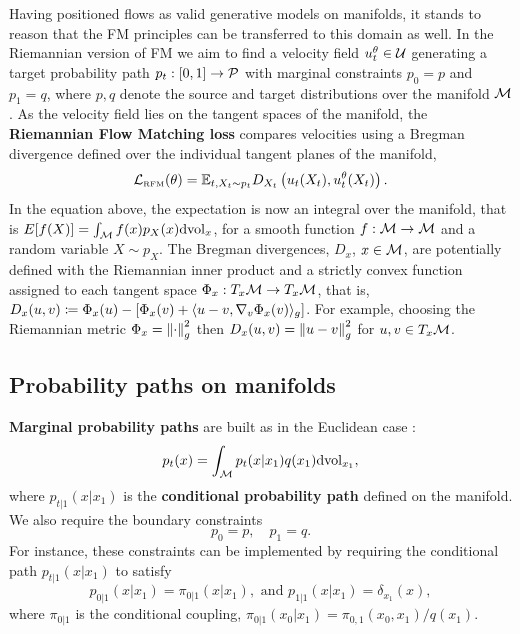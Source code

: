 \documentclass{fairmeta}
\newcommand{\highlight}[1]{{\color{metablue} \textbf{#1}}}
\renewcommand{\eqref}[1]{\labelcref{#1}}
\numberwithin{equation}{section}
\begin{document}
Having positioned flows as valid generative models on manifolds, it stands to reason that the FM principles can be transferred to this domain as well.
In the Riemannian version of FM we aim to find a velocity field $u_t^\theta\in{\mathcal{U}}$ generating a target probability path $p_t:[0,1]\rightarrow{\mathcal{P}}$ with marginal constraints $p_0=p$ and $p_1=q$, where $p,q$ denote the source and target distributions over the manifold ${\mathcal{M}}$.
As the velocity field lies on the tangent spaces of the manifold, the \highlight{Riemannian Flow Matching loss} compares velocities using a Bregman divergence defined over the individual tangent planes of the manifold, 
\begin{equation}\label{e:rfm_loss}
    \gL_{\RFM}(\theta) = \E_{t,X_t\sim p_t}D_{X_t}\parr{u_t(X_t),u_t^\theta(X_t)}. %
\end{equation}
In the equation above, the expectation is now an integral over the manifold, that is $E[f(X)]=\int_{\mathcal{M}} f(x)p_X(x)\mathrm{d} \mathrm{vol}_x$, for a smooth function $f:{\mathcal{M}}\rightarrow{\mathcal{M}}$ and a random variable $X\sim p_X$.
The Bregman divergences, $D_x$, $x\in{\mathcal{M}}$, are potentially defined with the Riemannian inner product and a strictly convex function assigned to each tangent space $\Phi_x:T_x{\mathcal{M}}\rightarrow T_x{\mathcal{M}}$, that is, $D_{x}(u,v) \coloneqq \Phi_x(u) - \left [ \Phi_x(v) + \langle u-v, \nabla_v \Phi_x(v) \rangle_g\right ]$. For example, choosing the Riemannian metric $\Phi_x=\left\Vert\cdot\right\Vert_g^2$ then  $D_x(u,v)=\left\Vert u-v\right\Vert^2_g$  for $u,v\in T_x{\mathcal{M}}$.


\subsection{Probability paths on manifolds}

\highlight{Marginal probability paths} are built as in the Euclidean case \eqref{e:p_t}:
\begin{equation}\label{e:riemannian_p_t}
    p_t(x) = \int_\gM p_t(x|x_1)q(x_1) \dd \vol_{x_1},%
\end{equation}
where $p_{t|1}(x|x_1)$ is the \highlight{conditional probability path} defined on the manifold.
We also require the boundary constraints
\begin{equation}\label{e:riemannian_p_q_interp}
    p_0=p, \quad p_1=q. %
\end{equation}
For instance, these constraints can be implemented by requiring the conditional path $p_{t|1}(x|x_1)$ to satisfy
\begin{equation}\label{e:riemannian_p_t_cond_boundary}
    p_{0|1}(x|x_1) = \pi_{0|1}(x|x_1), \text{ and  } p_{1|1}(x|x_1)=\delta_{x_1}(x),
\end{equation}
where $\pi_{0|1}$ is the conditional coupling, $\pi_{0|1}(x_0|x_1)=\pi_{0,1}(x_0,x_1)/q(x_1)$.
\end{document}
